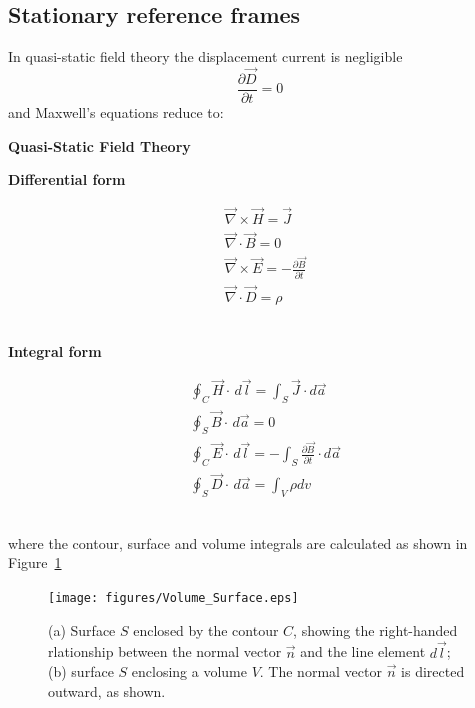 \documentclass[11pt,a4paper,oneside]{book}
\numberwithin{equation}{section}
\theoremstyle{it}
\theoremstyle{definition}
\begin{document}
\subsection{Stationary reference frames}
In quasi-static field theory the displacement current is negligible 
\begin{equation*}
	\frac{\partial\vec{D}}{\partial t} = 0
\end{equation*} 
and Maxwell's equations reduce to:
\setlength{\columnseprule}{1pt}
	\bigskip
	\ \newline \centerline{\textbf{Quasi-Static Field Theory}}
\begin{multicols}{2}
	\centerline{\textbf{Differential form}}	
	\begin{equation*}
	\begin{aligned}
		&\vec{\nabla}\times\vec{H} = \vec{J} \\[6pt]
		&\vec{\nabla}\cdot\vec{B} = 0 \\[6pt]
		&\vec{\nabla}\times\vec{E} = -\frac{\partial\vec{B}}{\partial t} \\[6pt]
		&\vec{\nabla}\cdot\vec{D} = \rho
	\end{aligned}
\end{equation*} 
	\ \newline
	\columnbreak
	\ \newline
	\centerline{\textbf{Integral form}}
\begin{equation}\label{maxwell_eq}
	\begin{aligned}
		&\oint_C \vec{H}\cdot\,d\vec{l}=\int_S\vec{J}\cdot d\vec{a}	 \\[6pt]
		&\oint_S \vec{B}\cdot\,d\vec{a}=0	 \\[6pt]
		&\oint_C \vec{E}\cdot\,d\vec{l}=-\int_S\frac{\partial\vec{B}}{\partial t}\cdot d\vec{a}	 \\[6pt]
		&\oint_S \vec{D}\cdot\,d\vec{a}=\int_V\rho dv	
	\end{aligned}
\end{equation} 
	\ \newline
\end{multicols}
where the contour, surface and volume integrals are calculated as shown in Figure~\ref{surfaces}
\begin{figure}[H]
	\centering
	\texttt{[image: figures/Volume\_Surface.eps]}
	\captionsetup{width=0.75\textwidth}		
	\caption{(a) Surface $S$ enclosed by the contour $C$, showing the right-handed rlationship between the normal vector $\vec{n}$ and the line element $d\vec{l}$; (b) surface $S$ enclosing a volume $V$. The normal vector $\vec{n}$ is directed outward, as shown.}
	\label{surfaces}
\end{figure}
\end{document}
